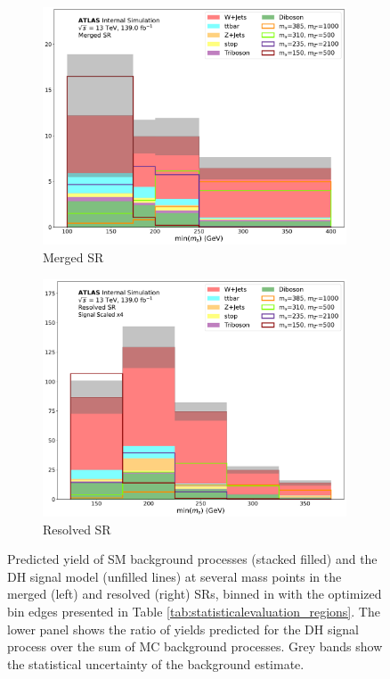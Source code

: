 \begin{figure}[htbp]
  \centering
    \begin{subfigure}[t]{0.48\textwidth}
    \centering
     \includegraphics[width = 0.99\textwidth]{Figures/7/SR1L_Merged_fit/TARJets10_minmS_mgd.pdf}
    \caption{Merged SR}
    \end{subfigure}
    \begin{subfigure}[t]{0.48\textwidth}
    \centering
     \includegraphics[width = 0.99\textwidth]{Figures/7/SR1L_Resolved_fit/TARJets10_minmS_res.pdf}
     \caption{Resolved SR}
    \end{subfigure}
    \caption{Predicted yield of SM background processes (stacked filled) and the DH signal model (unfilled lines) at several mass points in the merged (left) and resolved (right) SRs, binned in \minms with the optimized bin edges presented in Table \ref{tab:statisticalevaluation_regions}. The lower panel shows the ratio of yields predicted for the DH signal process over the sum of MC background processes. Grey bands show the statistical uncertainty of the background estimate.}
   \label{fig:minms_binning}
\end{figure}

